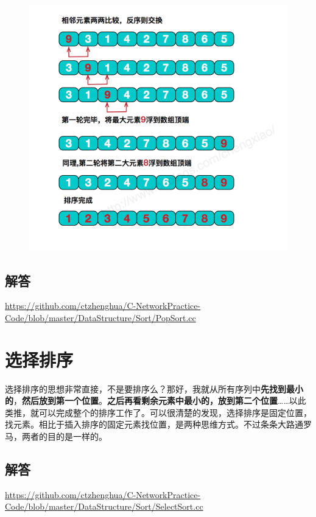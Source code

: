 \documentclass[UTF8,a4paper,12pt]{ctexbook}
\begin{document}
		\begin{figure}[h]
			\centering
			\includegraphics[scale = 0.7]{Pop.png}
		\end{figure}
	
	\subsection{解答}
	\url{https://github.com/ctzhenghua/C-NetworkPractice-Code/blob/master/DataStructure/Sort/PopSort.cc}
		
\section{选择排序}
	
	选择排序的思想非常直接，不是要排序么？那好，我就从所有序列中\textbf{先找到最小的}，\textbf{然后放到第一个位置}。\textbf{之后再看剩余元素中最小的，放到第二个位置}……以此类推，就可以完成整个的排序工作了。可以很清楚的发现，选择排序是固定位置，找元素。相比于插入排序的固定元素找位置，是两种思维方式。不过条条大路通罗马，两者的目的是一样的。
	
	\subsection{解答}
	\url{https://github.com/ctzhenghua/C-NetworkPractice-Code/blob/master/DataStructure/Sort/SelectSort.cc}
		
\end{document}
